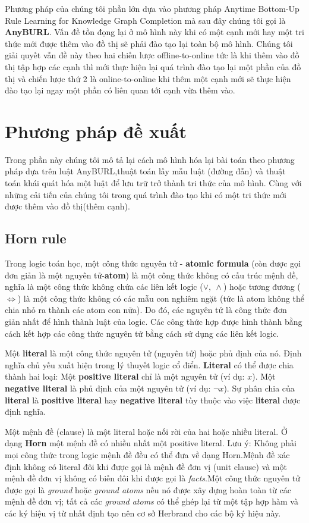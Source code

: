 Phương pháp của chúng tôi phần lớn dựa vào phương pháp Anytime Bottom-Up Rule Learning for Knowledge Graph Completion \cite{meilicke2019anytime} mà sau đây chúng tôi gọi là \textbf{AnyBURL}. Vấn đề tồn đọng lại ở mô hình này khi có một cạnh mới hay một tri thức mới được thêm vào đồ thị sẽ phải đào tạo lại toàn bộ mô hình. Chúng tôi giải quyết vẫn đề này theo hai chiến lược offline-to-online tức là khi thêm vào đồ thị tập hợp các cạnh thì mới thực hiện lại quá trình đào tạo lại một phần của đồ thị và chiến lược thứ 2 là online-to-online  khi thêm một cạnh mới sẽ thực hiện đào tạo lại ngay một phần có liên quan tới cạnh vừa thêm vào.
\section{Phương pháp đề xuất}
Trong phần này chúng tôi mô tả lại cách mô hình hóa lại bài toán theo phương pháp dựa trên luật AnyBURL,thuật toán lấy mẫu luật (đường đẫn) và thuật toán khái quát hóa một luật để lưu trữ trở thành tri thức của mô hình. Cùng với những cải tiến của chúng tôi trong quá trình đào tạo khi có một tri thức mới được thêm vào đồ thị(thêm cạnh).
\subsection{Horn rule}
Trong logic toán học, một công thức nguyên tử - \textbf{atomic formula}\cite{wiki:Atomic} (còn được gọi đơn giản là một nguyên tử-\textbf{atom}) là một công thức không có cấu trúc mệnh đề, nghĩa là một công thức không chứa các liên kết logic (\(\vee, ~ \wedge\)) hoặc tương đương (\(\Leftrightarrow\)) là một công thức không có các mẫu con nghiêm ngặt (tức là atom không thể chia nhỏ ra thành các atom con nữa). Do đó, các nguyên tử là công thức đơn giản nhất để hình thành luật của logic. Các công thức hợp được hình thành bằng cách kết hợp các công thức nguyên tử bằng cách sử dụng các liên kết logic.

Một \textbf{literal}\cite{wiki:Literal} là một công thức nguyên tử (nguyên tử) hoặc phủ định của nó. Định nghĩa chủ yếu xuất hiện trong lý thuyết logic cổ điển. \textbf{Literal} có thể được chia thành hai loại: Một \textbf{positive literal} chỉ là một nguyên tử (ví dụ: \(x\)). Một \textbf{negative literal} là phủ định của một nguyên tử (ví dụ: \(\neg x\)). Sự phân chia của \textbf{literal} là \textbf{positive literal} hay \textbf{negative literal} tùy thuộc vào việc \textbf{literal} được định nghĩa.

Một mệnh đề (clause) là một literal hoặc nối rời của hai hoặc nhiều literal. Ở dạng \textbf{Horn} một mệnh đề có nhiều nhất một positive literal. Lưu ý: Không phải mọi công thức trong logic mệnh đề đều có thể đưa về dạng Horn.Mệnh đề xác định không có literal đôi khi được gọi là mệnh đề đơn vị (unit clause) và một mệnh đề đơn vị không có biến đôi khi được gọi là \textit{facts}\cite{wiki:Horn}.Một công thức nguyên tử được gọi là \textit{ground} hoặc \textit{ground atoms} nếu nó được xây dựng hoàn toàn từ các mệnh đề đơn vị; tất cả các \textit{ground atoms} có thể ghép lại từ một tập hợp hàm và các ký hiệu vị từ nhất định tạo nên cơ sở Herbrand cho các bộ ký hiệu này\cite{wiki:Term}.

